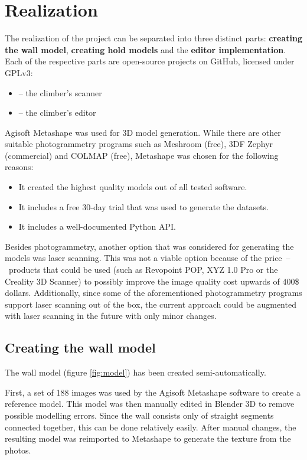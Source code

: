 \chapter{Realization}\label{sec:realization}

The realization of the project can be separated into three distinct parts: \textbf{creating the wall model}, \textbf{creating hold models} and the \textbf{editor implementation}.
Each of the respective parts are open-source projects on GitHub, licensed under GPLv3:
\begin{itemize}
	\item \raisebox{-0.08em}{} -- the climber's scanner \cite{clis}
	\item \raisebox{-0.08em}{} -- the climber's editor \cite{cled}
\end{itemize}

Agisoft Metashape was used for 3D model generation.
While there are other suitable photogrammetry programs such as Meshroom (free), 3DF Zephyr (commercial) and COLMAP (free), Metashape was chosen for the following reasons:
\begin{itemize}
	\item It created the highest quality models out of all tested software.
	\item It includes a free 30-day trial that was used to generate the datasets.
	\item It includes a well-documented Python API.
\end{itemize}

Besides photogrammetry, another option that was considered for generating the models was laser scanning.
This was not a viable option because of the price~--~products that could be used (such as Revopoint POP, XYZ 1.0 Pro or the Creality 3D Scanner) to possibly improve the image quality cost upwards of $400$\$ dollars.
Additionally, since some of the aforementioned photogrammetry programs support laser scanning out of the box, the current approach could be augmented with laser scanning in the future with only minor changes.

\section{Creating the wall model}
The wall model (figure \ref{fig:model}) has been created semi-automatically.

First, a set of 188 images was used by the Agisoft Metashape software to create a reference model.
This model was then manually edited in Blender 3D to remove possible modelling errors.
Since the wall consists only of straight segments connected together, this can be done relatively easily.
After manual changes, the resulting model was reimported to Metashape to generate the texture from the photos.

